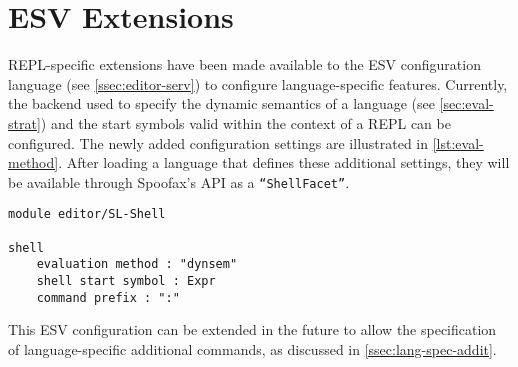 \section{ESV Extensions}
\label{sec:esv-extensions}

REPL-specific extensions have been made available to the ESV configuration
language (see \cref{ssec:editor-serv}) to configure language-specific
features. Currently, the backend used to specify the dynamic semantics of a
language (see \cref{sec:eval-strat}) and the start symbols valid within the
context of a REPL can be configured. The newly added configuration settings are
illustrated in \cref{lst:eval-method}. After loading a language that defines
these additional settings, they will be available through Spoofax's API as a
\texttt{``ShellFacet''}.

\begin{lstlisting}[language=esv,caption={Configuring language specific settings.},label={lst:eval-method}]
module editor/SL-Shell

shell
    evaluation method : "dynsem"
    shell start symbol : Expr
    command prefix : ":"
\end{lstlisting}

This ESV configuration can be extended in the future to allow the specification
of language-specific additional commands, as discussed in
\cref{ssec:lang-spec-addit}.


